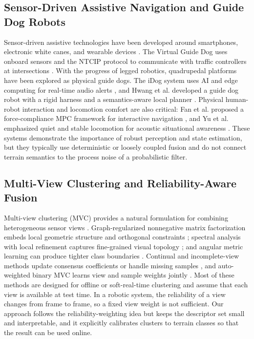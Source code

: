 \documentclass[final,3p,times]{elsarticle}
\begin{document}
\subsection{Sensor-Driven Assistive Navigation and Guide Dog Robots}
Sensor-driven assistive technologies have been developed around smartphones, electronic white canes, and wearable devices \cite{patel2024review, wang2026design, ye2016co}. The Virtual Guide Dog uses onboard sensors and the NTCIP protocol to communicate with traffic controllers at intersections \cite{zhong2020virtual}. With the progress of legged robotics, quadrupedal platforms have been explored as physical guide dogs. The iDog system uses AI and edge computing for real-time audio alerts \cite{chen2024idog}, and Hwang et al. developed a guide dog robot with a rigid harness and a semantics-aware local planner \cite{hwang2022system}. Physical human-robot interaction and locomotion comfort are also critical: Fan et al. proposed a force-compliance MPC framework for interactive navigation \cite{fan2024force}, and Yu et al. emphasized quiet and stable locomotion for acoustic situational awareness \cite{yu2025human}. These systems demonstrate the importance of robust perception and state estimation, but they typically use deterministic or loosely coupled fusion and do not connect terrain semantics to the process noise of a probabilistic filter.

\subsection{Multi-View Clustering and Reliability-Aware Fusion}
Multi-view clustering (MVC) provides a natural formulation for combining heterogeneous sensor views \cite{wang2024self, chowdhury2025deep, fang2023comprehensive}. Graph-regularized nonnegative matrix factorization embeds local geometric structure and orthogonal constraints \cite{zhang2018multi}; spectral analysis with local refinement captures fine-grained visual topology \cite{xu2021multi}; and angular metric learning can produce tighter class boundaries \cite{shi2023deep}. Continual and incomplete-view methods update consensus coefficients or handle missing samples \cite{wan2023fast, liang2022incomplete}, and auto-weighted binary MVC learns view and sample weights jointly \cite{houfar2023automatically}. Most of these methods are designed for offline or soft-real-time clustering and assume that each view is available at test time. In a robotic system, the reliability of a view changes from frame to frame, so a fixed view weight is not sufficient. Our approach follows the reliability-weighting idea but keeps the descriptor set small and interpretable, and it explicitly calibrates clusters to terrain classes so that the result can be used online.
\end{document}
